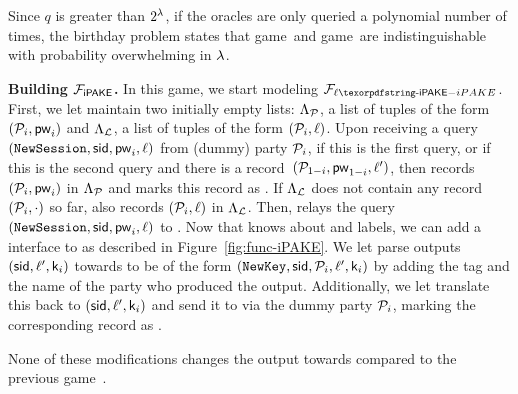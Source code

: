 \begin{games}
Since $q$ is greater than $2^{\lambda}$, if the oracles are only queried a polynomial number of times, the birthday problem states that game~\previousgame and game~\thisgame are indistinguishable with probability overwhelming in $\lambda$.

\textbf{Building $\mathcal{F}_\textsf{iPAKE}$.} In this game, we start modeling $\FliPAKE$.
First, we let \Func maintain two initially empty lists: $\Lambda_{\mathcal{P}}$, a list of tuples of the form $(\mathcal{P}_{i},\mathsf{pw}_{i})$ and $\Lambda_{\mathcal{L}}$, a list of tuples of the form $(\mathcal{P}_{i},\ell)$. Upon receiving a query $(\texttt{NewSession},\mathsf{sid},\mathsf{pw}_{i},\ell)$ from (dummy) party $\mathcal{P}_{i}$, if this is the first \NewSession query, or if this is the second \NewSession query and there is a record~$(\mathcal{P}_{1-i},\mathsf{pw}_{1-i},\ell')$, then \Func records~$(\mathcal{P}_{i},\mathsf{pw}_{i})$ in $\Lambda_{\mathcal{P}}$ and marks this record  as .
If $\Lambda_{\mathcal{L}}$ does not contain any record $(\mathcal{P}_{i},\cdot)$ so far, \Func also records $(\mathcal{P}_{i},\ell)$ in $\Lambda_{\mathcal{L}}$. Then, \Func relays the query $(\texttt{NewSession},\mathsf{sid},\mathsf{pw}_{i},\ell)$ to \Sim. Now that \Func knows about \passwords and labels, we can add a \TestPwd interface to \Func as described in Figure~\ref{fig:func-iPAKE}.
We let \Sim parse outputs $(\mathsf{sid},\ell',\mathsf{k}_{i})$ towards \Func to be of the form $(\texttt{NewKey},\mathsf{sid},\mathcal{P}_{i},\ell',\mathsf{k}_{i})$ by adding the \NewKey tag and the name of the party who produced the output.
Additionally, we let \Func translate this back to $(\mathsf{sid},\ell',\mathsf{k}_{i})$ and send it to \Env via the dummy party $\mathcal{P}_{i}$, marking the corresponding record as .

None of these modifications changes the output towards \Env compared to the previous game~\previousgame. 


\end{games}
